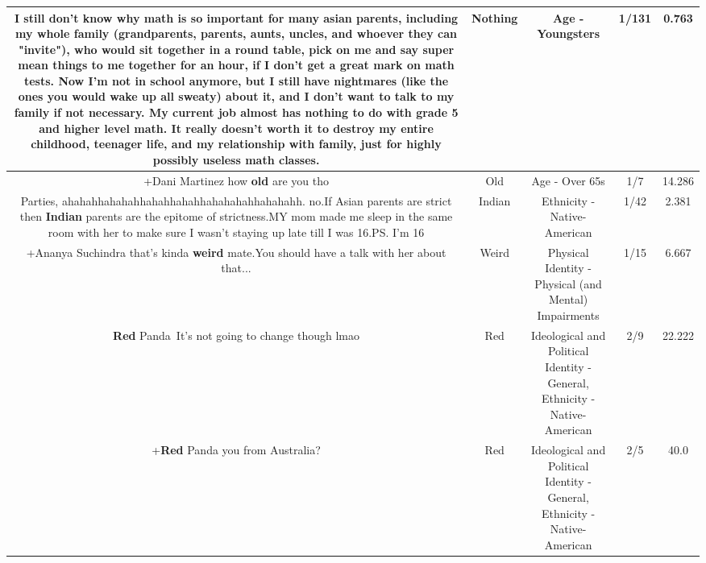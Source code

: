 \documentclass[11pt]{article}
\newlength\mylength
\begin{document}
\begin{center}
\begin{longtable}{|C{.65\mylength}|C{.30\mylength}|C{.12\mylength}|C{.12\mylength}|C{.12\mylength}|}
  \small I still don't know why math is so important for many asian parents, including my whole family (grandparents, parents, aunts, uncles, and whoever they can "invite"), who would sit together in a round table, pick on me and say super mean things to me together for an hour, if I don't get a great mark on math tests. Now I'm not in school anymore, but I still have nightmares (like the ones you would wake up all sweaty) about it, and I don't want to talk to my family if not necessary. My current job almost has \textbf{nothing} to do with grade 5 and higher level math. It really doesn't worth it to destroy my entire childhood, teenager life, and my relationship with family, just for highly possibly useless math classes.\normalsize   & Nothing & Age - Youngsters & 1/131 & 0.763 \\  \hline
  \small +Dani Martinez how \textbf{old} are you tho\normalsize   & Old & Age - Over 65s & 1/7 & 14.286 \\  \hline
  \small Parties, ahahahhahahahhahahhahahhahahahahhahahahh. no.If Asian parents are strict then \textbf{Indian} parents are the epitome of strictness.MY mom made me sleep in the same room with her to make sure I wasn't staying up late till I was 16.PS. I'm 16\normalsize   & Indian & Ethnicity - Native-American & 1/42 & 2.381 \\  \hline
  \small +Ananya Suchindra that's kinda \textbf{weird} mate.You should have a talk with her about that...\normalsize   & Weird & Physical Identity - Physical (and Mental) Impairments & 1/15 & 6.667 \\  \hline
  \small \@\textbf{R\textbf{ed}} Panda It's not going to change though lmao\normalsize   & Red &  Ideological and Political Identity - General, Ethnicity - Native-American & 2/9 & 22.222 \\  \hline
  \small +\textbf{R\textbf{ed}} Panda you from Australia?\normalsize   & Red &  Ideological and Political Identity - General, Ethnicity - Native-American & 2/5 & 40.0 \\  \hline

\end{longtable}
\end{center}
\end{document}
